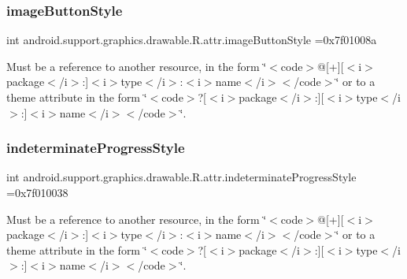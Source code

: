 \subsubsection{\texorpdfstring{image\+Button\+Style}{imageButtonStyle}}
{\footnotesize\ttfamily int android.\+support.\+graphics.\+drawable.\+R.\+attr.\+image\+Button\+Style =0x7f01008a\hspace{0.3cm}{\ttfamily [static]}}

Must be a reference to another resource, in the form \char`\"{}$<$code$>$@\mbox{[}+\mbox{]}\mbox{[}$<$i$>$package$<$/i$>$\+:\mbox{]}$<$i$>$type$<$/i$>$\+:$<$i$>$name$<$/i$>$$<$/code$>$\char`\"{} or to a theme attribute in the form \char`\"{}$<$code$>$?\mbox{[}$<$i$>$package$<$/i$>$\+:\mbox{]}\mbox{[}$<$i$>$type$<$/i$>$\+:\mbox{]}$<$i$>$name$<$/i$>$$<$/code$>$\char`\"{}. \mbox{\label{classandroid_1_1support_1_1graphics_1_1drawable_1_1R_1_1attr_a1b5c755e6edc5f79361ff7d1e80c99f2}} 
\subsubsection{\texorpdfstring{indeterminate\+Progress\+Style}{indeterminateProgressStyle}}
{\footnotesize\ttfamily int android.\+support.\+graphics.\+drawable.\+R.\+attr.\+indeterminate\+Progress\+Style =0x7f010038\hspace{0.3cm}{\ttfamily [static]}}

Must be a reference to another resource, in the form \char`\"{}$<$code$>$@\mbox{[}+\mbox{]}\mbox{[}$<$i$>$package$<$/i$>$\+:\mbox{]}$<$i$>$type$<$/i$>$\+:$<$i$>$name$<$/i$>$$<$/code$>$\char`\"{} or to a theme attribute in the form \char`\"{}$<$code$>$?\mbox{[}$<$i$>$package$<$/i$>$\+:\mbox{]}\mbox{[}$<$i$>$type$<$/i$>$\+:\mbox{]}$<$i$>$name$<$/i$>$$<$/code$>$\char`\"{}. \mbox{\label{classandroid_1_1support_1_1graphics_1_1drawable_1_1R_1_1attr_a817d3875d93521ec0f7b405184d5b12e}} 

